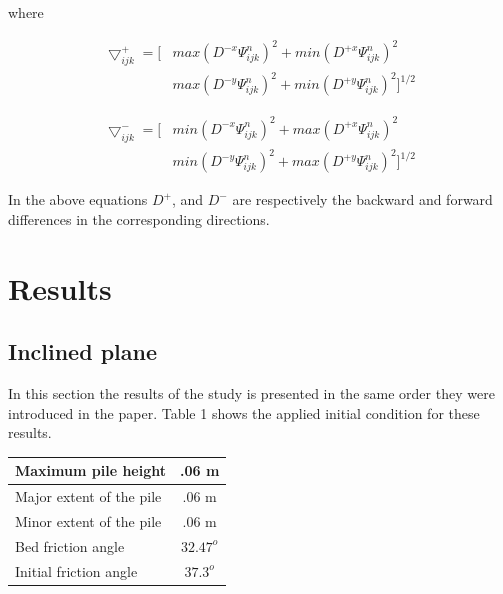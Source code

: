 \documentclass[letterpaper,10pt]{article}
\begin{document}
where 

\begin{equation}
\begin{aligned}
 \bigtriangledown_{ijk}^{+} = \big[ & max(D^{-x}\varPsi_{ijk}^{n})^2 + min(D^{+x}\varPsi_{ijk}^{n})^2
 \\& max(D^{-y}\varPsi_{ijk}^{n})^2 + min(D^{+y}\varPsi_{ijk}^{n})^2 \big]^{1/2}
\end{aligned}
\end{equation}
 
\begin{equation}
\begin{aligned}
 \bigtriangledown_{ijk}^{-} = \big[ & min(D^{-x}\varPsi_{ijk}^{n})^2 + max(D^{+x}\varPsi_{ijk}^{n})^2
 \\& min(D^{-y}\varPsi_{ijk}^{n})^2 + max(D^{+y}\varPsi_{ijk}^{n})^2 \big]^{1/2}
\end{aligned}
\end{equation} 

In the above equations $D^+$, and $D^-$ are  respectively the backward and forward differences in the corresponding directions.


\section{Results} \label{results}
\subsection{Inclined plane}
In this section the results of the study is presented in the same order they were introduced in the paper.
Table 1 shows the applied initial condition for these results.
\begin{center}
 
\begin{tabular}{|l|c|}

\hline
Maximum pile height       & .06 m \\
\hline
Major extent of the pile  & .06 m \\
\hline
Minor extent of the pile  & .06 m \\
\hline           
Bed friction angle        & $32.47^o$ \\
\hline
Initial friction angle    & $37.3^o$ \\
\hline
\end{tabular}
\end{center}
\end{document}
